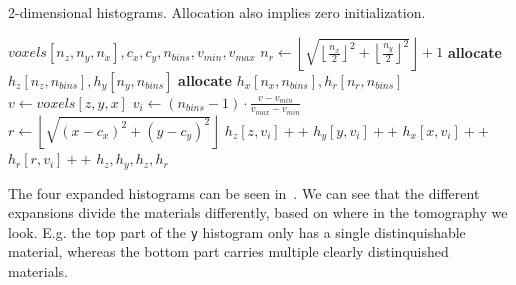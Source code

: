 

\begin{algorithm}
    \caption{2-dimensional histograms. Allocation also implies zero initialization.}
    \label{alg:2dhists}
    \begin{algorithmic}
         {$voxels[n_z,n_y,n_x],c_x,c_y,n_{bins},v_{min},v_{max}$}
            \State $n_r \gets \left\lfloor\sqrt{\left\lfloor \frac{n_x}{2} \right\rfloor^2 + \left\lfloor \frac{n_y}{2} \right\rfloor^2}\right\rfloor+1$
            \State \textbf{allocate} $h_z[n_z,n_{bins}], h_y[n_y,n_{bins}]$
            \State \textbf{allocate} $h_x[n_x,n_{bins}], h_r[n_r,n_{bins}]$
                \State $v \gets voxels[z,y,x]$
                    \State $v_{i} \gets (n_{bins}-1) \cdot \frac{v - v_{min}}{v_{max} - v_{min}}$
                    \State $r \gets \left\lfloor\sqrt{(x-c_x)^2 + (y-c_y)^2}\right\rfloor$
                    \State $h_z[z,v_{i}]{+}{+}$
                    \State $h_y[y,v_{i}]{+}{+}$
                    \State $h_x[x,v_{i}]{+}{+}$
                    \State $h_r[r,v_{i}]{+}{+}$
                \EndIf
            \EndFor
            \Return $h_z,h_y,h_z,h_r$
        \EndFunction
    \end{algorithmic}
\end{algorithm}

The four expanded histograms can be seen in~.
We can see that the different expansions divide the materials differently, based on where in the tomography we look.
E.g. the top part of the \texttt{y} histogram only has a single distinquishable material, whereas the bottom part carries multiple clearly distinquished materials.

